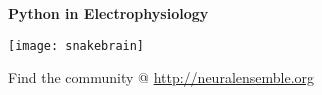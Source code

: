 





\begin{multicols}{3}    %

\begin{center}\Large \textbf{Python in Electrophysiology}\end{center}

\begin{center}
\noindent
\texttt{[image: snakebrain]}

Find the community @ \url{http://neuralensemble.org}


\end{center}
\vspace{0em}








\end{multicols}
